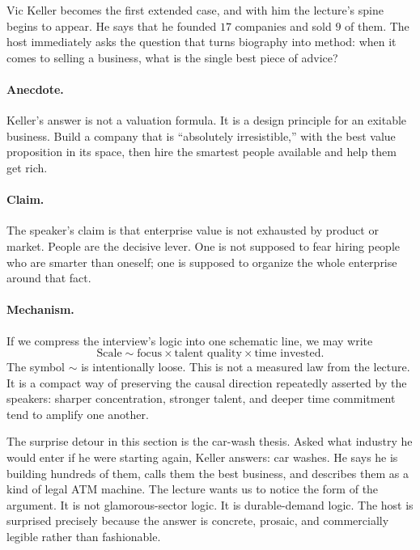 Vic Keller becomes the first extended case, and with him the lecture's spine begins to appear. He says that he founded \(17\) companies and sold \(9\) of them. The host immediately asks the question that turns biography into method: when it comes to selling a business, what is the single best piece of advice?

\paragraph{Anecdote.} Keller's answer is not a valuation formula. It is a design principle for an exitable business. Build a company that is ``absolutely irresistible,'' with the best value proposition in its space, then hire the smartest people available and help them get rich.

\paragraph{Claim.} The speaker's claim is that enterprise value is not exhausted by product or market. People are the decisive lever. One is not supposed to fear hiring people who are smarter than oneself; one is supposed to organize the whole enterprise around that fact.

\paragraph{Mechanism.} If we compress the interview's logic into one schematic line, we may write
\begin{equation}
\text{Scale} \sim \text{focus} \times \text{talent quality} \times \text{time invested}.
\end{equation}
The symbol \(\sim\) is intentionally loose. This is not a measured law from the lecture. It is a compact way of preserving the causal direction repeatedly asserted by the speakers: sharper concentration, stronger talent, and deeper time commitment tend to amplify one another.

The surprise detour in this section is the car-wash thesis. Asked what industry he would enter if he were starting again, Keller answers: car washes. He says he is building hundreds of them, calls them the best business, and describes them as a kind of legal ATM machine. The lecture wants us to notice the form of the argument. It is not glamorous-sector logic. It is durable-demand logic. The host is surprised precisely because the answer is concrete, prosaic, and commercially legible rather than fashionable.

